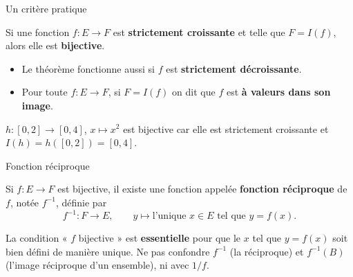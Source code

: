 \documentclass[aspectratio=169,11pt]{beamer}
\newcommand{\key}[1]{\textbf{\color{DarkBlue}#1}}
\newcommand{\important}[1]{\textbf{\color{DarkRed}#1}}
\newcommand{\fonc}[3]{#1\colon #2\to #3}
\begin{document}
\begin{frame}{Un critère pratique}
	\begin{definitionbox}[Théorème 2.1]
		Si une fonction $\fonc{f}{E}{F}$ est \key{strictement croissante} et telle que
		$F=I(f)$, alors elle est \key{bijective}.
	\end{definitionbox}
	\vspace{0.2cm}
	\begin{attentionbox}
		\begin{itemize}
			\item Le théorème fonctionne aussi si $f$ est \key{strictement décroissante}.
			\item Pour toute $\fonc{f}{E}{F}$, si $F=I(f)$ on dit que $f$ est
			\key{à valeurs dans son image}.
		\end{itemize}
	\end{attentionbox}
	\vspace{0.15cm}
	\begin{exemplebox}
		$\fonc{h}{[0,2]}{[0,4]}$, $x\longmapsto x^2$ est bijective car elle est
		strictement croissante et $I(h)=h([0,2])=[0,4]$.
	\end{exemplebox}
\end{frame}

\begin{frame}{Fonction réciproque}
	\begin{definitionbox}
		Si $\fonc{f}{E}{F}$ est bijective, il existe une fonction appelée
		\key{fonction réciproque} de $f$, notée $f^{-1}$, définie par
		\[
			f^{-1} \colon F \longrightarrow E, \qquad
			y \longmapsto \text{l'unique } x\in E \text{ tel que } y=f(x).
		\]
	\end{definitionbox}
	\vspace{0.15cm}
	\begin{attentionbox}
		La condition « $f$ bijective » est \important{essentielle} pour que le $x$ tel que
		$y=f(x)$ soit bien défini de manière unique.
		Ne pas confondre $f^{-1}$ (la réciproque) et $f^{-1}(B)$ (l'image réciproque d'un ensemble),
		ni avec $1/f$.
	\end{attentionbox}
\end{frame}
\end{document}
